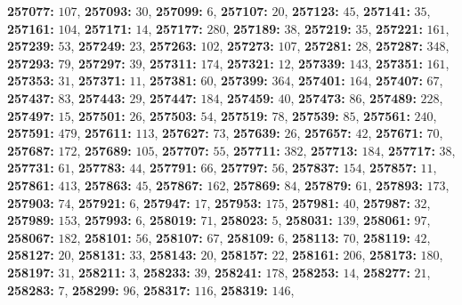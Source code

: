 \textsf{\bfseries 257077:} $107$, \textsf{\bfseries 257093:} $30$, \textsf{\bfseries 257099:} $6$, \textsf{\bfseries 257107:} $20$, \textsf{\bfseries 257123:} $45$, \textsf{\bfseries 257141:} $35$, \textsf{\bfseries 257161:} $104$, \textsf{\bfseries 257171:} $14$, \textsf{\bfseries 257177:} $280$, \textsf{\bfseries 257189:} $38$, \textsf{\bfseries 257219:} $35$, \textsf{\bfseries 257221:} $161$, \textsf{\bfseries 257239:} $53$, \textsf{\bfseries 257249:} $23$, \textsf{\bfseries 257263:} $102$, \textsf{\bfseries 257273:} $107$, \textsf{\bfseries 257281:} $28$, \textsf{\bfseries 257287:} $348$, \textsf{\bfseries 257293:} $79$, \textsf{\bfseries 257297:} $39$, \textsf{\bfseries 257311:} $174$, \textsf{\bfseries 257321:} $12$, \textsf{\bfseries 257339:} $143$, \textsf{\bfseries 257351:} $161$, \textsf{\bfseries 257353:} $31$, \textsf{\bfseries 257371:} $11$, \textsf{\bfseries 257381:} $60$, \textsf{\bfseries 257399:} $364$, \textsf{\bfseries 257401:} $164$, \textsf{\bfseries 257407:} $67$, \textsf{\bfseries 257437:} $83$, \textsf{\bfseries 257443:} $29$, \textsf{\bfseries 257447:} $184$, \textsf{\bfseries 257459:} $40$, \textsf{\bfseries 257473:} $86$, \textsf{\bfseries 257489:} $228$, \textsf{\bfseries 257497:} $15$, \textsf{\bfseries 257501:} $26$, \textsf{\bfseries 257503:} $54$, \textsf{\bfseries 257519:} $78$, \textsf{\bfseries 257539:} $85$, \textsf{\bfseries 257561:} $240$, \textsf{\bfseries 257591:} $479$, \textsf{\bfseries 257611:} $113$, \textsf{\bfseries 257627:} $73$, \textsf{\bfseries 257639:} $26$, \textsf{\bfseries 257657:} $42$, \textsf{\bfseries 257671:} $70$, \textsf{\bfseries 257687:} $172$, \textsf{\bfseries 257689:} $105$, \textsf{\bfseries 257707:} $55$, \textsf{\bfseries 257711:} $382$, \textsf{\bfseries 257713:} $184$, \textsf{\bfseries 257717:} $38$, \textsf{\bfseries 257731:} $61$, \textsf{\bfseries 257783:} $44$, \textsf{\bfseries 257791:} $66$, \textsf{\bfseries 257797:} $56$, \textsf{\bfseries 257837:} $154$, \textsf{\bfseries 257857:} $11$, \textsf{\bfseries 257861:} $413$, \textsf{\bfseries 257863:} $45$, \textsf{\bfseries 257867:} $162$, \textsf{\bfseries 257869:} $84$, \textsf{\bfseries 257879:} $61$, \textsf{\bfseries 257893:} $173$, \textsf{\bfseries 257903:} $74$, \textsf{\bfseries 257921:} $6$, \textsf{\bfseries 257947:} $17$, \textsf{\bfseries 257953:} $175$, \textsf{\bfseries 257981:} $40$, \textsf{\bfseries 257987:} $32$, \textsf{\bfseries 257989:} $153$, \textsf{\bfseries 257993:} $6$, \textsf{\bfseries 258019:} $71$, \textsf{\bfseries 258023:} $5$, \textsf{\bfseries 258031:} $139$, \textsf{\bfseries 258061:} $97$, \textsf{\bfseries 258067:} $182$, \textsf{\bfseries 258101:} $56$, \textsf{\bfseries 258107:} $67$, \textsf{\bfseries 258109:} $6$, \textsf{\bfseries 258113:} $70$, \textsf{\bfseries 258119:} $42$, \textsf{\bfseries 258127:} $20$, \textsf{\bfseries 258131:} $33$, \textsf{\bfseries 258143:} $20$, \textsf{\bfseries 258157:} $22$, \textsf{\bfseries 258161:} $206$, \textsf{\bfseries 258173:} $180$, \textsf{\bfseries 258197:} $31$, \textsf{\bfseries 258211:} $3$, \textsf{\bfseries 258233:} $39$, \textsf{\bfseries 258241:} $178$, \textsf{\bfseries 258253:} $14$, \textsf{\bfseries 258277:} $21$, \textsf{\bfseries 258283:} $7$, \textsf{\bfseries 258299:} $96$, \textsf{\bfseries 258317:} $116$, \textsf{\bfseries 258319:} $146$, 
